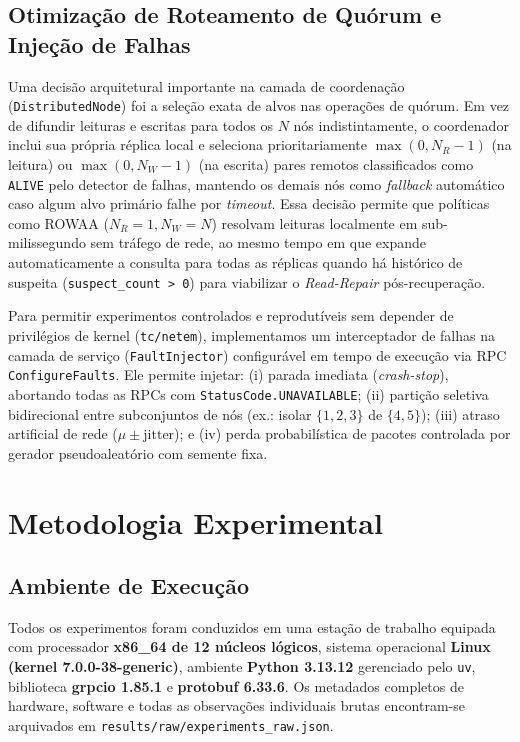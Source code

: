 \documentclass[conference,10pt]{IEEEtran}
\begin{document}
\subsection{Otimização de Roteamento de Quórum e Injeção de Falhas}

Uma decisão arquitetural importante na camada de coordenação (\texttt{DistributedNode}) foi a seleção exata de alvos nas operações de quórum. Em vez de difundir leituras e escritas para todos os $N$ nós indistintamente, o coordenador inclui sua própria réplica local e seleciona prioritariamente $\max(0, N_R - 1)$ (na leitura) ou $\max(0, N_W - 1)$ (na escrita) pares remotos classificados como \texttt{ALIVE} pelo detector de falhas, mantendo os demais nós como \textit{fallback} automático caso algum alvo primário falhe por \textit{timeout}. Essa decisão permite que políticas como ROWAA ($N_R=1, N_W=N$) resolvam leituras localmente em sub-milissegundo sem tráfego de rede, ao mesmo tempo em que expande automaticamente a consulta para todas as réplicas quando há histórico de suspeita (\texttt{suspect\_count > 0}) para viabilizar o \textit{Read-Repair} pós-recuperação.

Para permitir experimentos controlados e reprodutíveis sem depender de privilégios de kernel (\texttt{tc/netem}), implementamos um interceptador de falhas na camada de serviço (\texttt{FaultInjector}) configurável em tempo de execução via RPC \texttt{ConfigureFaults}. Ele permite injetar: (i) parada imediata (\textit{crash-stop}), abortando todas as RPCs com \texttt{StatusCode.UNAVAILABLE}; (ii) partição seletiva bidirecional entre subconjuntos de nós (ex.: isolar $\{1,2,3\}$ de $\{4,5\}$); (iii) atraso artificial de rede ($\mu \pm \text{jitter}$); e (iv) perda probabilística de pacotes controlada por gerador pseudoaleatório com semente fixa.

\section{Metodologia Experimental}

\subsection{Ambiente de Execução}

Todos os experimentos foram conduzidos em uma estação de trabalho equipada com processador \textbf{x86\_64 de 12 núcleos lógicos}, sistema operacional \textbf{Linux (kernel 7.0.0-38-generic)}, ambiente \textbf{Python 3.13.12} gerenciado pelo \texttt{uv}, biblioteca \textbf{grpcio 1.85.1} e \textbf{protobuf 6.33.6}. Os metadados completos de hardware, software e todas as observações individuais brutas encontram-se arquivados em \texttt{results/raw/experiments\_raw.json}.
\end{document}
